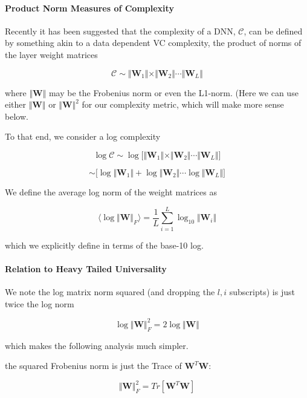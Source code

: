 
\paragraph{Product Norm Measures of Complexity}

Recently it has been suggested that the complexity of a DNN, $\mathcal{C}$,  can be defined by something akin to a data dependent VC complexity, the product of norms of the layer weight matrices

$$\mathcal{C}\sim\Vert\mathbf{W}_{1}\Vert\times\Vert\mathbf{W}_{2}\Vert\cdots\Vert\mathbf{W}_{L}\Vert$$

where $\Vert\mathbf{W}\Vert$ may be the Frobenius norm or even the L1-norm.  (Here we can use either  $\Vert\mathbf{W}\Vert$ or $\Vert\mathbf{W}\Vert^{2}$ for our complexity metric, which will make more sense below.


 To that end, we consider a log complexity

$$\log\mathcal{C}\sim\log\bigg[\Vert\mathbf{W}_{1}\Vert\times\Vert\mathbf{W}_{2}\Vert\cdots\Vert\mathbf{W}_{L}\Vert\bigg]$$

$$\sim\bigg[\log\Vert\mathbf{W}_{1}\Vert+\log\Vert\mathbf{W}_{2}\Vert\cdots\log\Vert\mathbf{W}_{L}\Vert\bigg]$$

We define the average log norm of the weight matrices as

$$\langle\log\Vert\mathbf{W}\Vert_{F}\rangle=\dfrac{1}{L}\sum_{i=1}^{L}\log_{10}\Vert\mathbf{W}_{i}\Vert$$

which we explicitly define in terms of the base-10 log.

\paragraph{Relation to Heavy Tailed Universality}

We note the  log matrix norm squared (and dropping the $l,i$ subscripts) is just twice the log norm

$$\log\Vert\mathbf{W}\Vert_{F}^{2}=2\log\Vert\mathbf{W}\Vert$$

which makes the following analysis much simpler.

the squared Frobenius norm is just the Trace of $\mathbf{W}^{T}\mathbf{W}$:

$$\Vert\mathbf{W}\Vert_{F}^{2}=Tr[\mathbf{W}^{T}\mathbf{W}]$$

